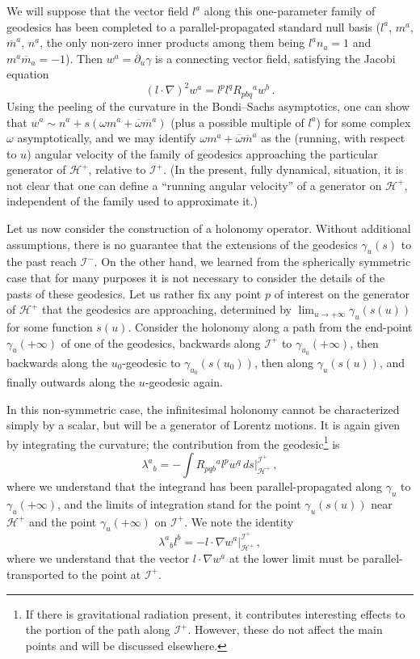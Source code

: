 \documentclass[12pt]{article}
\newcommand{\scrif}{{{\mathscr I}^{+}}}
\newcommand{\scrip}{{{\mathscr I}^{-}}}
\newcommand{\Hf}{{{\mathscr H}^{+}}} %
\begin{document}
We will suppose that the vector field $l^a$ along this 
one-parameter family of geodesics has been completed to a
parallel-propagated standard null basis ($l^a$, $m^a$, ${\overline m}^a$, $n^a$, the only 
non-zero inner products among them being $l^an_a=1$ and $m^a{\overline m}_a=-1$).  Then $w^a=\partial _u\gamma$ is a connecting vector field, satisfying the Jacobi equation
\begin{equation}
  (l\cdot\nabla )^2w^a=l^pl^qR_{pbq}{}^aw^b\, .
\end{equation}
Using the peeling of the curvature in the Bondi--Sachs asymptotics, one can show that $w^a\sim n^a +s(\omega  m^a +\overline\omega {\overline m}^a)$ (plus a possible multiple of $l^a$) for some complex $\omega$ asymptotically, and we may identify 
$\omega  m^a +\overline\omega  {\overline m}^a$ as the (running, with respect to $u$) angular velocity of the
family of geodesics approaching the particular generator of $\Hf$, relative to $\scrif$.  (In the present, fully dynamical, situation, it is not clear that one can define a ``running angular velocity'' of a generator on $\Hf$, independent of the family used to approximate it.)

Let us now consider the construction of a holonomy operator.  
Without additional assumptions, there is no guarantee that the extensions of the geodesics $\gamma _u(s)$ to the past reach $\scrip$.  On the other hand, we learned from the spherically symmetric case that for many purposes it is not necessary to consider the details of the pasts of these geodesics.  Let us rather fix any point $p$ of interest on the generator of $\Hf$ that the geodesics are approaching, determined by $\lim _{u\to +\infty}\gamma _u(s(u))$ for some function $s(u)$.  
Consider the holonomy along a path from the 
end-point $\gamma _u(+\infty )$ of one of the geodesics, backwards along $\scrif$ to $\gamma _{u_0}(+\infty )$, then backwards along the $u_0$-geodesic to $\gamma _{u_0}(s(u_0))$, then along $\gamma _u(s(u))$, and finally outwards along the $u$-geodesic again.

In this non-symmetric case, the infinitesimal holonomy cannot be characterized simply by a scalar, but will be a generator of Lorentz motions.  It is again given by integrating the curvature; the contribution from the geodesic\footnote{If there is gravitational radiation present, it contributes interesting effects to the portion of the path along $\scrif$.  However, these do not affect the main points and will be discussed elsewhere.}
is
\begin{equation}
  \lambda ^a{}_b=-\int R_{pqb}{}^al^p w^q\, ds\Bigr| _\Hf ^\scrif\, ,
\end{equation}
where we understand that the integrand has been parallel-propagated along $\gamma _u$ to $\gamma _u(+\infty )$, and the limits of integration stand for the point $\gamma _u(s(u))$ near $\Hf$ and the point $\gamma _u(+\infty )$ on $\scrif$.
We note the identity 
\begin{equation}\label{lambdident}
  \lambda ^a{}_b l^b=-l\cdot\nabla w^a\Bigr| _\Hf ^\scrif\, ,
\end{equation}
where
we understand that the vector $l\cdot\nabla w^a$ at
the lower limit must be parallel-transported to the point at $\scrif$.
\end{document}
